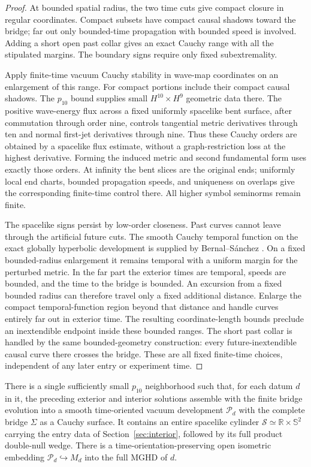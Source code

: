 \begin{proof}
At bounded spatial radius, the two time cuts give compact closure in
regular coordinates. Compact subsets have compact causal shadows toward
the bridge; far out only bounded-time propagation with bounded speed is
involved. Adding a short open past collar gives an exact Cauchy range
with all the stipulated margins. The boundary signs require only
fixed subextremality.

Apply finite-time vacuum Cauchy stability in wave-map coordinates on an
enlargement of this range. For compact portions include their compact
causal shadows. The $p_{10}$ bound supplies small
$H^{10}\times H^9$ geometric data there. The positive wave-energy flux
across a fixed uniformly spacelike bent surface, after commutation
through order nine, controls tangential metric derivatives through ten
and normal first-jet derivatives through nine. Thus these Cauchy orders
are obtained by a spacelike flux estimate, without a graph-restriction
loss at the highest derivative. Forming the induced metric and second
fundamental form uses exactly those orders. At infinity the bent slices
are the original ends; uniformly local end charts, bounded propagation
speeds, and uniqueness on overlaps give the corresponding finite-time
control there. All higher symbol seminorms remain finite.

The spacelike signs persist by low-order closeness. Past curves cannot
leave through the artificial future cuts. The smooth Cauchy temporal
function on the exact globally hyperbolic development is supplied by
Bernal--S{\'a}nchez \cite[Theorem~1.1]{BernalSanchez2005}. On a fixed
bounded-radius enlargement it remains temporal with a uniform margin
for the perturbed metric. In the far part the exterior times are
temporal, speeds are bounded, and the time to the bridge is bounded.
An excursion from a fixed bounded radius can therefore travel only a
fixed additional distance. Enlarge the compact temporal-function region
beyond that distance and handle curves entirely far out in exterior
time. The resulting coordinate-length bounds preclude an inextendible
endpoint inside these bounded ranges. The short past collar is handled
by the same bounded-geometry construction: every future-inextendible
causal curve there crosses the bridge. These are all fixed finite-time
choices, independent of any later entry or experiment time.
\end{proof}

\begin{proposition}\label{cmp:development}
There is a single sufficiently small $p_{10}$ neighborhood such that,
for each datum $d$ in it, the preceding exterior and interior solutions
assemble with the finite bridge evolution into a smooth time-oriented
vacuum development $\mathcal P_d$ with the complete bridge $\Sigma$
as a Cauchy surface. It contains an entire spacelike cylinder
$\mathcal S\simeq\mathbb R\times\mathbb S^2$ carrying the entry data
of Section~\ref{sec:interior}, followed by its full product double-null
wedge. There is a time-orientation-preserving open isometric embedding
$\mathcal P_d\hookrightarrow M_d$ into the full MGHD of $d$.
\end{proposition}

